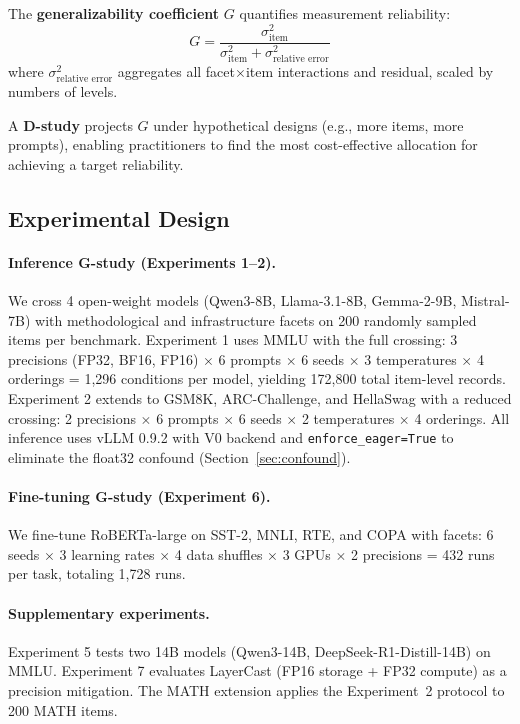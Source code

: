 \documentclass[letterpaper]{article}
\begin{document}
The \textbf{generalizability coefficient} $G$ quantifies measurement reliability:
\begin{equation}
    G = \frac{\sigma^2_{\text{item}}}{\sigma^2_{\text{item}} + \sigma^2_{\text{relative error}}}
\end{equation}
where $\sigma^2_{\text{relative error}}$ aggregates all facet$\times$item interactions and residual, scaled by numbers of levels.

A \textbf{D-study} projects $G$ under hypothetical designs (e.g., more items, more prompts), enabling practitioners to find the most cost-effective allocation for achieving a target reliability.

\subsection{Experimental Design}

\paragraph{Inference G-study (Experiments 1--2).}
We cross 4 open-weight models (Qwen3-8B, Llama-3.1-8B, Gemma-2-9B, Mistral-7B) with methodological and infrastructure facets on 200 randomly sampled items per benchmark.
Experiment 1 uses MMLU with the full crossing: 3 precisions (FP32, BF16, FP16) $\times$ 6 prompts $\times$ 6 seeds $\times$ 3 temperatures $\times$ 4 orderings = 1{,}296 conditions per model, yielding 172{,}800 total item-level records.
Experiment 2 extends to GSM8K, ARC-Challenge, and HellaSwag with a reduced crossing: 2 precisions $\times$ 6 prompts $\times$ 6 seeds $\times$ 2 temperatures $\times$ 4 orderings.
All inference uses vLLM 0.9.2 with V0 backend and \texttt{enforce\_eager=True} to eliminate the float32 confound (Section~\ref{sec:confound}).

\paragraph{Fine-tuning G-study (Experiment 6).}
We fine-tune RoBERTa-large on SST-2, MNLI, RTE, and COPA with facets: 6 seeds $\times$ 3 learning rates $\times$ 4 data shuffles $\times$ 3 GPUs $\times$ 2 precisions = 432 runs per task, totaling 1{,}728 runs.

\paragraph{Supplementary experiments.}
Experiment 5 tests two 14B models (Qwen3-14B, DeepSeek-R1-Distill-14B) on MMLU.
Experiment 7 evaluates LayerCast (FP16 storage + FP32 compute) as a precision mitigation.
The MATH extension applies the Experiment~2 protocol to 200 MATH items.
\end{document}
